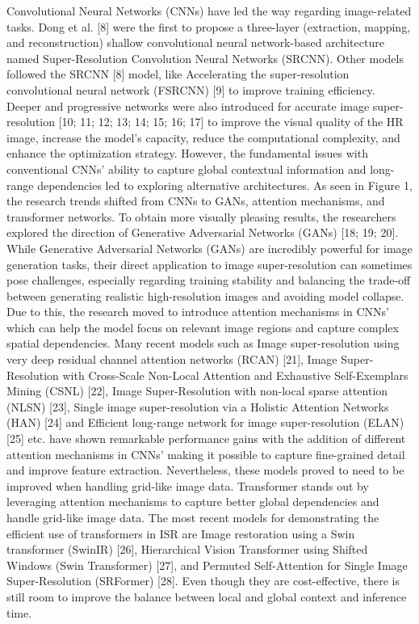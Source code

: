 \documentclass[twocolumn]{svjour3}          %
\begin{document}
Convolutional Neural Networks (CNNs) have led the way regarding image-related tasks. Dong et al. [8] were the first to propose a three-layer (extraction, mapping, and reconstruction) shallow convolutional neural network-based architecture named Super-Resolution Convolution Neural Networks (SRCNN). Other models followed the SRCNN [8] model, like Accelerating the super-resolution convolutional neural network (FSRCNN) [9] to improve training efficiency. Deeper and progressive networks were also introduced for accurate image super-resolution [10; 11; 12; 13; 14; 15; 16; 17] to improve the visual quality of the HR image, increase the model's capacity,  reduce the computational complexity, and enhance the optimization strategy. However, the fundamental issues with conventional CNNs' ability to capture global contextual information and long-range dependencies led to exploring alternative architectures. As seen in Figure 1, the research trends shifted from CNNs to GANs, attention mechanisms, and transformer networks. To obtain more visually pleasing results, the researchers explored the direction of Generative Adversarial Networks (GANs) [18; 19; 20]. While Generative Adversarial Networks (GANs) are incredibly powerful for image generation tasks, their direct application to image super-resolution can sometimes pose challenges, especially regarding training stability and balancing the trade-off between generating realistic high-resolution images and avoiding model collapse. Due to this, the research moved to introduce attention mechanisms in CNNs' which can help the model focus on relevant image regions and capture complex spatial dependencies. Many recent models such as Image super-resolution using very deep residual channel attention networks (RCAN) [21], Image Super-Resolution with Cross-Scale Non-Local Attention and Exhaustive Self-Exemplars Mining (CSNL) [22], Image Super-Resolution with non-local sparse attention (NLSN) [23], Single image super-resolution via a Holistic Attention Networks (HAN) [24] and Efficient long-range network for image super-resolution (ELAN) [25] etc. have shown remarkable performance gains with the addition of different attention mechanisms in CNNs' making it possible to capture fine-grained detail and improve feature extraction. Nevertheless, these models proved to need to be improved when handling grid-like image data. Transformer stands out by leveraging attention mechanisms to capture better global dependencies and handle grid-like image data. The most recent models for demonstrating the efficient use of transformers in ISR are Image restoration using a Swin transformer (SwinIR) [26], Hierarchical Vision Transformer using Shifted Windows (Swin Transformer) [27], and Permuted Self-Attention for Single Image Super-Resolution (SRFormer) [28]. Even though they are cost-effective, there is still room to improve the balance between local and global context and inference time.
\end{document}
